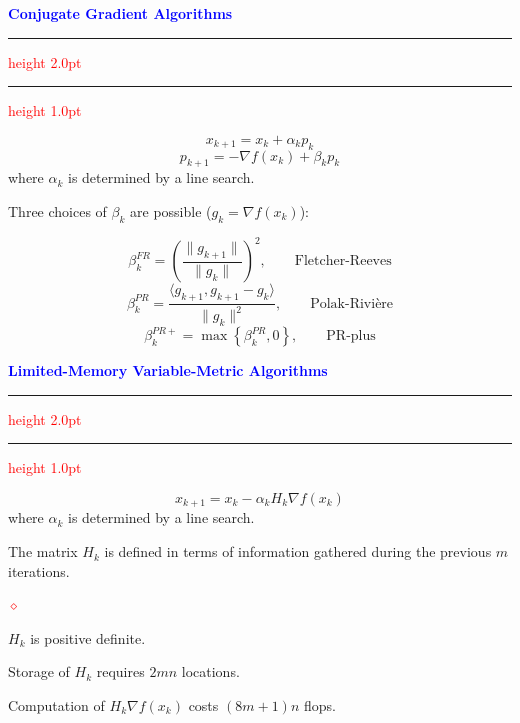 \documentclass{seminar}
\newcommand{\grad}{\nabla}
\newcommand{\reddiamond}{\textcolor{red}{$\diamond$}}
\newcommand{\redstripe}{\textcolor{red}{\hrule height 2.0pt\hfil}
             \vspace{-1.8pt}
             \textcolor{red}{\hrule height 1.0pt\hfil}
}
\newcommand{\heading}[1]{%
   \centerline{\textcolor{blue}{\textbf{#1}}}%
    \redstripe%
    \bigskip
}
\begin{document}
\begin{slide}

\heading{Conjugate Gradient Algorithms}

\[
x_{k+1} = x_k + \alpha_k p_k 
\]
\[
p_{k+1} = - \grad f (x_k) + \beta_k p_k 
\]
where $ \alpha_k $ is determined by a line search.

\medskip

Three choices of $ \beta_k $ are possible ($ g_k = \grad f (x_k ) $):
 
\[
\beta_k^{FR} = \left (
\frac{\| g_{k+1} \|}{\| g_k \|}
\right ) ^ 2 , \qquad \mbox{Fletcher-Reeves}
\]
\[
\beta_k^{PR} = 
\frac{ \langle g_{k+1} , g_{k+1} - g_k \rangle }
{\| g_k \|^2},  \qquad \mbox{Polak-Rivi\`ere}
\]
\[
\beta_k^{PR+} = \max \left \{ \beta_k^{PR} , 0 \right \} , \qquad
\mbox{PR-plus}
\]

\vfill

\end{slide}

\begin{slide}

\heading{Limited-Memory Variable-Metric Algorithms}

\[
x_{k+1} = x_k - \alpha_k H_k \grad f (x_k )
\]
where $ \alpha_k $ is determined by a line search.

\medskip 

The matrix $ H_k $ is defined in terms
of information gathered during the
previous $m$ iterations.

\medskip

\begin{list}{\reddiamond}{}
\item
$ H_k $ is positive definite.
\item
Storage of $ H_k $ requires $ 2 m n $ locations.
\item
Computation of $ H_k \grad f (x_k) $ costs
$ (8m+1) n $ flops.
\end{list}

\vfill

\end{slide}
\end{document}
